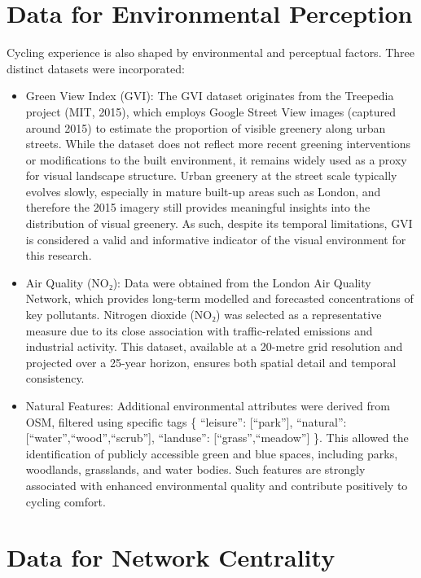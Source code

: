\documentclass[
  12pt,
  oneside]{book}
\begin{document}
\section{Data for Environmental Perception}\label{data-for-environmental-perception}

Cycling experience is also shaped by environmental and perceptual factors. Three distinct datasets were incorporated:

\begin{itemize}
\item
  Green View Index (GVI): The GVI dataset originates from the Treepedia project (MIT, 2015), which employs Google Street View images (captured around 2015) to estimate the proportion of visible greenery along urban streets. While the dataset does not reflect more recent greening interventions or modifications to the built environment, it remains widely used as a proxy for visual landscape structure. Urban greenery at the street scale typically evolves slowly, especially in mature built-up areas such as London, and therefore the 2015 imagery still provides meaningful insights into the distribution of visual greenery. As such, despite its temporal limitations, GVI is considered a valid and informative indicator of the visual environment for this research.
\item
  Air Quality (NO₂): Data were obtained from the London Air Quality Network, which provides long-term modelled and forecasted concentrations of key pollutants. Nitrogen dioxide (NO₂) was selected as a representative measure due to its close association with traffic-related emissions and industrial activity. This dataset, available at a 20-metre grid resolution and projected over a 25-year horizon, ensures both spatial detail and temporal consistency.
\item
  Natural Features: Additional environmental attributes were derived from OSM, filtered using specific tags \{ ``leisure'': {[}``park''{]}, ``natural'': {[}``water'',``wood'',``scrub''{]}, ``landuse'': {[}``grass'',``meadow''{]} \}. This allowed the identification of publicly accessible green and blue spaces, including parks, woodlands, grasslands, and water bodies. Such features are strongly associated with enhanced environmental quality and contribute positively to cycling comfort.
\end{itemize}

\section{Data for Network Centrality}\label{data-for-network-centrality}
\end{document}
